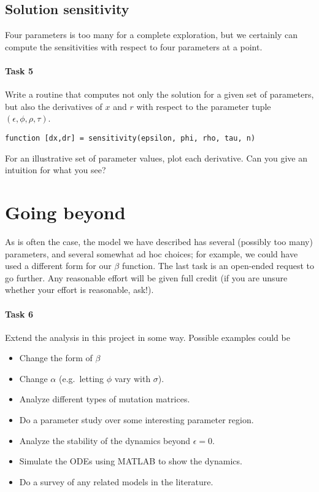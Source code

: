 \documentclass[12pt, leqno]{article} %
\begin{document}
\subsection{Solution sensitivity}

Four parameters is too many for a complete exploration,
but we certainly can compute the sensitivities with respect
to four parameters at a point.

\paragraph{Task 5}
Write a routine that computes
not only the solution for a given set of parameters, but also
the derivatives of $x$ and $r$ with respect to the parameter
tuple $(\epsilon, \phi, \rho, \tau)$.
\begin{lstlisting}[frame=single]
function [dx,dr] = sensitivity(epsilon, phi, rho, tau, n)
\end{lstlisting}
For an illustrative set of parameter values, plot each derivative.
Can you give an intuition for what you see?

\section{Going beyond}

As is often the case, the model we have described has several
(possibly too many) parameters, and several somewhat ad hoc choices;
for example, we could have used a different form for our $\beta$
function.  The last task is an open-ended request to go further.  Any
reasonable effort will be given full credit (if you are unsure whether
your effort is reasonable, ask!).

\paragraph{Task 6}
Extend the analysis in this project in some way.  Possible examples
could be
\begin{itemize}
\item Change the form of $\beta$
\item Change $\alpha$ (e.g.~letting $\phi$ vary with $\sigma$).
\item Analyze different types of mutation matrices.
\item Do a parameter study over some interesting parameter region.
\item Analyze the stability of the dynamics beyond $\epsilon = 0$.
\item Simulate the ODEs using MATLAB to show the dynamics.
\item Do a survey of any related models in the literature.
\end{itemize}
\end{document}
